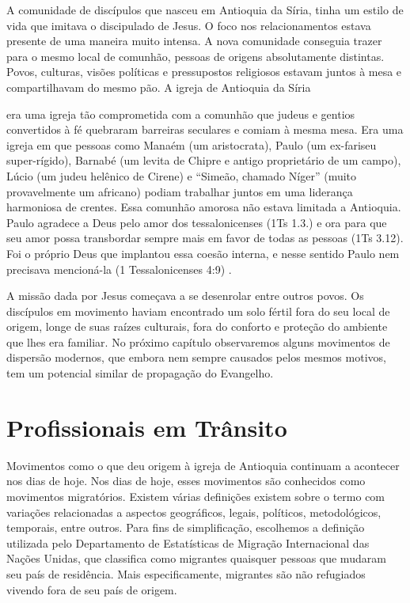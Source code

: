 \documentclass[12pt]{abntex2}
\begin{document}

A comunidade de discípulos que nasceu em Antioquia da Síria, tinha um estilo de vida que imitava o discipulado de Jesus. O foco nos relacionamentos estava presente de uma maneira muito intensa. A nova comunidade conseguia trazer para o mesmo local de comunhão, pessoas de origens absolutamente distintas. Povos, culturas, visões políticas e pressupostos religiosos estavam juntos à mesa e compartilhavam do mesmo pão. A igreja de Antioquia da Síria

\begin{citacao}
era uma igreja tão comprometida com a comunhão que judeus e gentios convertidos à fé quebraram barreiras seculares e comiam à mesma mesa. Era uma igreja em que pessoas como Manaém (um aristocrata), Paulo (um ex-fariseu super-rígido), Barnabé (um levita de Chipre e antigo proprietário de um campo), Lúcio (um judeu helênico de Cirene) e “Simeão, chamado Níger” (muito provavelmente um africano) podiam trabalhar juntos em uma liderança harmoniosa de crentes. Essa comunhão amorosa não estava limitada a Antioquia. Paulo agradece a Deus pelo amor dos tessalonicenses (1Ts 1.3.) e ora para que seu amor possa transbordar sempre mais em favor de todas as pessoas (1Ts 3.12). Foi o próprio Deus que implantou essa coesão interna, e nesse sentido Paulo nem precisava mencioná-la (1 Tessalonicenses 4:9) \cite[p. 261]{green}.
\end{citacao}

A missão dada por Jesus começava a se desenrolar entre outros povos. Os discípulos em movimento haviam encontrado um solo fértil fora do seu local de origem, longe de suas raízes culturais, fora do conforto e proteção do ambiente que lhes era familiar. No próximo capítulo observaremos alguns movimentos de dispersão modernos, que embora nem sempre causados pelos mesmos motivos, tem um potencial similar de propagação do Evangelho.

\chapter{Profissionais em Trânsito}

Movimentos como o que deu origem à igreja de Antioquia continuam a acontecer nos dias de hoje. Nos dias de hoje, esses movimentos são conhecidos como movimentos migratórios. Existem várias definições existem sobre o termo com variações relacionadas a aspectos geográficos, legais, políticos, metodológicos, temporais, entre outros\cite{iom2020}. Para fins de simplificação, escolhemos a definição utilizada pelo Departamento de Estatísticas de Migração Internacional das Nações Unidas, que classifica como migrantes quaisquer pessoas que mudaram seu país de residência. Mais especificamente, migrantes são não refugiados vivendo fora de seu país de origem. 
\end{document}
